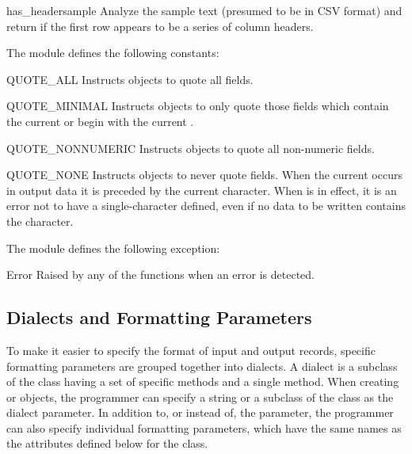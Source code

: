 \begin{methoddesc}{has_header}{sample}
Analyze the sample text (presumed to be in CSV format) and return
 if the first row appears to be a series of column
headers.
\end{methoddesc}


The  module defines the following constants:

\begin{datadesc}{QUOTE_ALL}
Instructs  objects to quote all fields.
\end{datadesc}

\begin{datadesc}{QUOTE_MINIMAL}
Instructs  objects to only quote those fields which contain
the current  or begin with the current .
\end{datadesc}

\begin{datadesc}{QUOTE_NONNUMERIC}
Instructs  objects to quote all non-numeric fields.
\end{datadesc}

\begin{datadesc}{QUOTE_NONE}
Instructs  objects to never quote fields.  When the current
 occurs in output data it is preceded by the current
 character.  When  is in effect, it
is an error not to have a single-character  defined, even if
no data to be written contains the  character.
\end{datadesc}


The  module defines the following exception:

\begin{excdesc}{Error}
Raised by any of the functions when an error is detected.
\end{excdesc}


\subsection{Dialects and Formatting Parameters\label{csv-fmt-params}}

To make it easier to specify the format of input and output records,
specific formatting parameters are grouped together into dialects.  A
dialect is a subclass of the  class having a set of specific
methods and a single  method.  When creating 
or  objects, the programmer can specify a string or a subclass
of the  class as the dialect parameter.  In addition to, or
instead of, the  parameter, the programmer can also specify
individual formatting parameters, which have the same names as the
attributes defined below for the  class.

